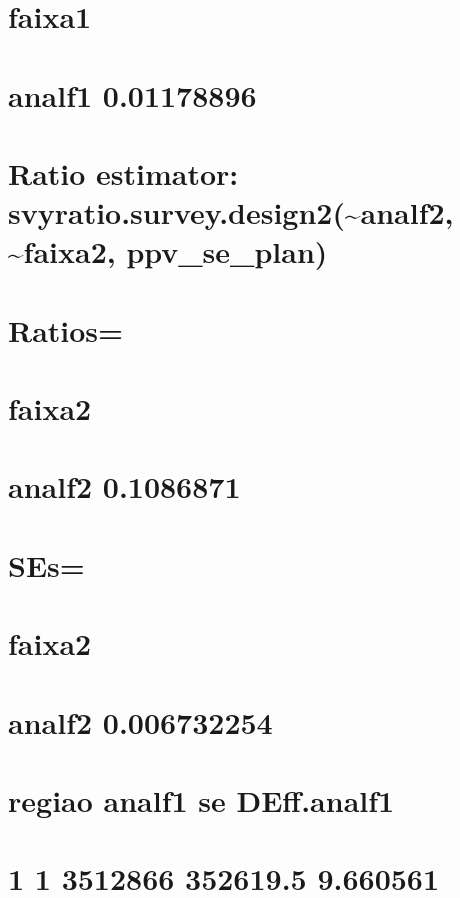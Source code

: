\documentclass[]{book}
\theoremstyle{definition}
\theoremstyle{definition}
\theoremstyle{definition}
\theoremstyle{remark}
\begin{document}
\section{faixa1}\label{faixa1-1}

\section{analf1 0.01178896}\label{analf1-0.01178896}

\section{Ratio estimator:
svyratio.survey.design2(\textasciitilde{}analf2,
\textasciitilde{}faixa2,
ppv\_se\_plan)}\label{ratio-estimator-svyratio.survey.design2analf2-faixa2-ppv_se_plan}

\section{Ratios=}\label{ratios-1}

\section{faixa2}\label{faixa2}

\section{analf2 0.1086871}\label{analf2-0.1086871}

\section{SEs=}\label{ses-1}

\section{faixa2}\label{faixa2-1}

\section{analf2 0.006732254}\label{analf2-0.006732254}

\section{regiao analf1 se
DEff.analf1}\label{regiao-analf1-se-deff.analf1}

\section{1 1 3512866 352619.5 9.660561}\label{section-1}
\end{document}

